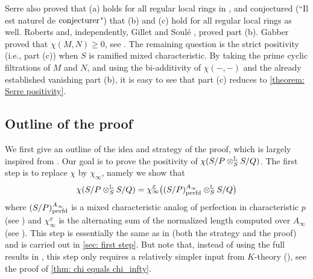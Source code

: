 \documentclass[12pt]{amsart}
\numberwithin{equation}{theorem}
\numberwithin{equation}{theorem}
\newcommand{\perfd}{\textnormal{perfd}}
\begin{document}
Serre also proved that (a) holds for all regular local rings in \cite{SerreBookLocalAlgebra1965}, and conjectured    (``Il est naturel de ${\hbox{\rm conjecturer}}$")
that  (b) and (c) hold for all regular local rings as well. Roberts \cite{RobertsVanishing1985} and, independently, Gillet and Soul\'e \cite{GilletSouleVanishing1987}, proved part (b). Gabber proved that $\chi(M,N) \geq 0$, see \cite{BerthelotGabberNonnegativity,HochsterNonnegativity1997}. The remaining question is the strict positivity (i.e., part (c)) when $S$ is ramified mixed characteristic. By taking the prime cyclic filtrations of $M$ and $N$, and using the bi-additivity of $\chi(-,-)$ and the already established vanishing part (b), it is easy to see that part (c) reduces to \autoref{theorem: Serre positivity}. 

\subsection*{Outline of the proof} 
We first give an outline of the idea and strategy of the proof, which is largely inspired from \cite{BhattHochsterMaLimCM2026}. Our goal is to prove the positivity of $\chi(S/P\otimes^{\mathbb{L}}_S S/Q)$. The first step is to replace $\chi$ by $\chi_\infty$, namely we show that 
$$\chi(S/P\otimes^\myL_S S/Q) = \chi_\infty^{\underline{x}}\big((S/P)^{A_\infty}_\perfd\otimes^\myL_S S/Q\big)$$
where $(S/P)^{A_\infty}_\perfd$ is a mixed characteristic analog of perfection in characteristic $p$ (see \cite[Section 8 and Section 10]{BhattScholzePrismaticCohomology2022}) and $\chi_\infty^{\underline{x}}$ is the alternating sum of the normalized length computed over $A_\infty$ (see \cite[Section 4]{CaiLeeMaSchwedeTuckerPerfdSignature2026}). This step is essentially the same as in \cite[Section 5.1, Lemma 5.2]{OpenAISerrePositivity2026} (both the strategy and the proof) and is carried out in \autoref{sec: first step}. But note that, instead of using the full results in \cite[Section 3]{OpenAISerrePositivity2026}, this step only requires a relatively simpler input from $K$-theory (\cite[Appendix A]{MaLech2026}), see the proof of \autoref{thm: chi equals chi_infty}. 
\end{document}
